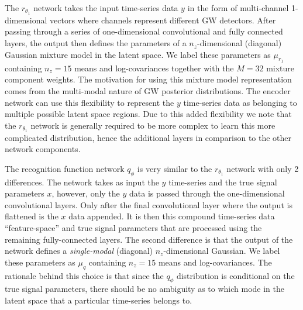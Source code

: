
%
%
The $r_{\theta_1}$ network takes the input time-series data $y$ in the form of
multi-channel 1-dimensional vectors where channels represent different \ac{GW}
detectors. After passing through a series of one-dimensional convolutional and fully connected
layers, the output then defines the parameters of a $n_z$-dimensional
(diagonal) Gaussian mixture model in the latent space. We label these
parameters as $\mu_{r_1}$ containing $n_z=15$ means and log-covariances
together with the $M=32$ mixture component weights. The motivation for using this
mixture model representation comes from the multi-modal nature of \ac{GW}
posterior distributions. The encoder network can use this flexibility to
represent the $y$ time-series data as belonging to multiple possible latent
space regions. Due to this added flexibility we note that the $r_{\theta_1}$
network is generally required to be more complex to learn this more complicated
distribution, hence the additional layers in comparison to the other network
components.   

%
% 
The recognition function network $q_{\phi}$ is very similar to the
$r_{\theta_1}$ network with only 2 differences. The network takes as input the
$y$ time-series and the true signal parameters $x$, however, only the $y$ data
is passed through the one-dimensional convolutional layers. Only after the
final convolutional layer where the output is flattened is the $x$ data
appended. It is then this compound time-series data ``feature-space'' and true
signal parameters that are processed using the remaining fully-connected
layers. The second difference is that the output of the network defines a
\emph{single-modal} (diagonal) $n_z$-dimensional Gaussian. We label these
parameters as $\mu_{q}$ containing $n_z=15$ means and log-covariances. The
rationale behind this choice is that since the $q_{\phi}$ distribution is
conditional on the true signal parameters, there should be no ambiguity as to
which mode in the latent space that a particular time-series belongs to.      

